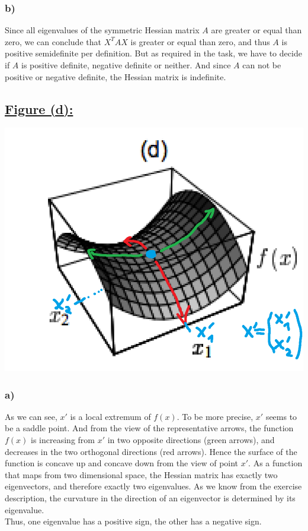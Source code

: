 \documentclass[a4paper]{article}
\begin{document}
        \subsubsection*{b)}
            Since all eigenvalues of the symmetric Hessian matrix $A$ are greater or equal than zero, we can conclude that $X^T A X$ is greater or equal than zero, and thus $A$ is positive semidefinite per definition.
            But as required in the task, we have to decide if $A$ is positive definite, negative definite or neither.
            And since $A$ can not be positive or negative definite, the Hessian matrix is indefinite.


\newpage
    \subsection*{\underline{Figure (d):}}
        \includegraphics[width=0.8\linewidth]{Assignment 5/4.png}
        \subsubsection*{a)}
            As we can see, $x'$ is a local extremum of $f(x)$. To be more precise, $x'$ seems to be a saddle point.
            And from the view of the representative arrows, the function $f(x)$ is increasing from $x'$ in two opposite directions (green arrows), and decreases in the two orthogonal directions (red arrows).
            Hence the surface of the function is concave up and concave down from the view of point $x'$.
            As a function that maps from two dimensional space, the Hessian matrix has exactly two eigenvectors, and therefore exactly two eigenvalues.
            As we know from the exercise description, the curvature in the direction of an eigenvector is determined by its eigenvalue.\\
            Thus, one eigenvalue has a positive sign, the other has a negative sign.
\end{document}
